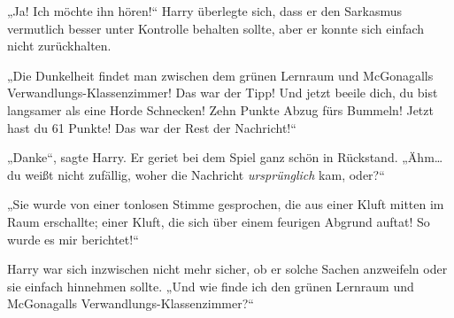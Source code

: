 „Ja! Ich möchte ihn hören!“ Harry überlegte sich, dass er den Sarkasmus vermutlich besser unter Kontrolle behalten sollte, aber er konnte sich einfach nicht zurückhalten.

„Die Dunkelheit findet man zwischen dem grünen Lernraum und McGonagalls Verwandlungs-Klassenzimmer! Das war der Tipp! Und jetzt beeile dich, du bist langsamer als eine Horde Schnecken! Zehn Punkte Abzug fürs Bummeln! Jetzt hast du 61 Punkte! Das war der Rest der Nachricht!“

„Danke“, sagte Harry. Er geriet bei dem Spiel ganz schön in Rückstand. „Ähm…du weißt nicht zufällig, woher die Nachricht \emph{ursprünglich} kam, oder?“

„Sie wurde von einer tonlosen Stimme gesprochen, die aus einer Kluft mitten im Raum erschallte; einer Kluft, die sich über einem feurigen Abgrund auftat! So wurde es mir berichtet!“

Harry war sich inzwischen nicht mehr sicher, ob er solche Sachen anzweifeln oder sie einfach hinnehmen sollte. „Und wie finde ich den grünen Lernraum und McGonagalls Verwandlungs-Klassenzimmer?“

